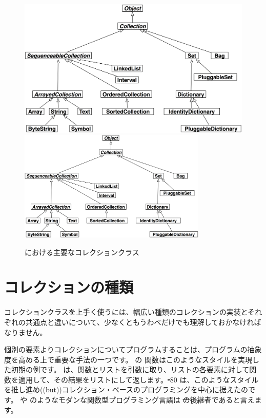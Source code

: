 \documentclass[a4paper,10pt,twoside]{book}
\begin{document}
\begin{figure}
\begin{center}
\ifluluelse
	{\includegraphics[width=\textwidth]{CollectionHierarchy}}
	{\includegraphics[width=0.8\textwidth]{CollectionHierarchy}}
\caption{\pharo における主要なコレクションクラス}
\end{center}
\end{figure}

\section{コレクションの種類}

コレクションクラスを上手く使うには、幅広い種類のコレクションの実装とそれぞれの共通点と違いについて、少なくともうわべだけでも理解しておかなければなりません。

個別の要素よりコレクションについてプログラムすることは、プログラムの抽象度を高める上で重要な手法の一つです。
 の  関数はこのようなスタイルを実現した初期の例です。 は、関数とリストを引数に取り、リストの各要素に対して関数を適用して、その結果をリストにして返します。\st-80 は、このようなスタイルを推し進め((but))コレクション・ベースのプログラミングを中心に据えたのです。 や  のようなモダンな関数型プログラミング言語は \st の後継者であると言えます。
\end{document}
